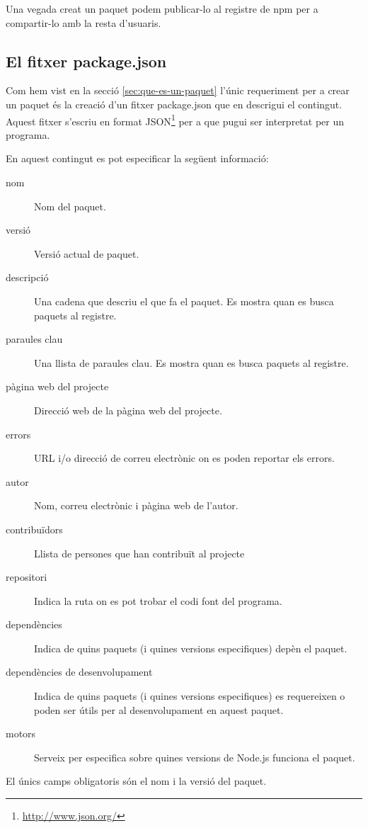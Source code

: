 Una vegada creat un paquet podem publicar-lo al registre de npm per a compartir-lo amb la resta d'usuaris. 

\subsection{El fitxer package.json}
\label{sec:fitxer-package.json}

Com hem vist en la secció \ref{sec:que-es-un-paquet} l'únic requeriment per a crear un paquet és la creació d'un fitxer package.json que en descrigui el contingut. Aquest fitxer s'escriu en format JSON\footnote{\url{http://www.json.org/}} per a que pugui ser interpretat per un programa.

En aquest contingut es pot especificar la següent informació: 
\begin{description}
\item[nom] {Nom del paquet.}
\item[versió] {Versió actual de paquet.}
\item[descripció] {Una cadena que descriu el que fa el paquet. Es mostra quan es busca paquets al registre.}
\item[paraules clau] {Una llista de paraules clau. Es mostra quan es busca paquets al registre.}
\item[pàgina web del projecte] {Direcció web de la pàgina web del projecte.}
\item[errors] { URL i/o direcció de correu electrònic on es poden reportar els errors. }
\item[autor] {Nom, correu electrònic i pàgina web de l'autor.}
\item[contribuïdors] { Llista de persones que han contribuït al projecte}
\item[repositori] { Indica la ruta on es pot trobar el codi font del programa. }
\item[dependències] { Indica de quins paquets (i quines versions especifiques) depèn el paquet.}
\item[dependències de desenvolupament] { Indica de quins paquets (i quines versions especifiques) es requereixen o poden ser útils per al desenvolupament en aquest paquet.}
\item[motors] {Serveix per especifica sobre quines versions de Node.js funciona el paquet.}

\end{description}

El únics camps obligatoris són el nom i la versió del paquet. 

